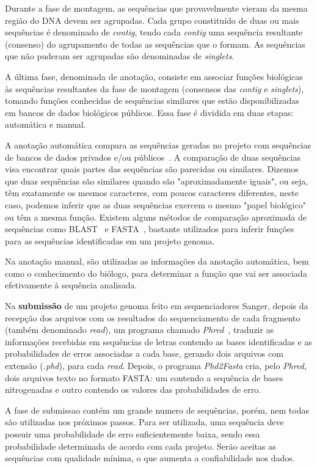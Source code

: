 Durante a fase de montagem, as sequências que provavelmente vieram da mesma região do DNA devem ser agrupadas. Cada grupo constituído de duas ou mais sequências é denominado de \textit{contig}, tendo cada \textit{contig} uma sequência resultante (consenso) do agrupamento de todas as sequências que o formam. As sequências que não puderam ser agrupadas são denominadas de \textit{singlets}. 

A última fase, denominada de anotação, consiste em associar funções biológicas às sequências resultantes da fase de montagem (consensos das \textit{contig} e \textit{singlets}), tomando funções conhecidas de sequências similares que estão disponibilizadas em bancos de dados biológicos públicos. Essa fase é dividida em duas etapas: automática e manual.

A anotação automática compara as sequências geradas no projeto com sequências de bancos de dados privados e/ou públicos~\citep{benson2006genbank:2006}. A comparação de duas sequências visa encontrar quais partes das sequências são parecidas ou similares. Dizemos que duas sequências são similares quando são "aproximadamente iguais", ou seja, têm exatamente os mesmos caracteres, com poucos caracteres diferentes, neste caso, podemos inferir que as duas sequências exercem o mesmo "papel biológico" ou têm a mesma função. Existem alguns métodos de comparação aproximada de sequências como BLAST~\citep{altschul1990basic:1990} e FASTA~\citep{pearson1988improved:1988}, bastante utilizados para inferir funções para as sequências identificadas em um projeto genoma.

Na anotação manual, são utilizadas as informações da anotação automática, bem como o conhecimento do biólogo, para determinar a função que vai ser associada efetivamente à sequência analisada.

Na \textbf{submissão} de um projeto genoma feito em sequenciadores Sanger, depois da recepção dos arquivos com os resultados do sequenciamento de cada fragmento (também denominado \textit{read}), um programa chamado \textit{Phred}~\citep{ewing1998base:1998}, traduzir as informações recebidas em sequências de letras contendo as bases identificadas e as probabilidades de erros associadas a cada base, gerando dois arquivos com extensão (\textit{.phd}), para cada \textit{read}. Depois, o programa \textit{Phd2Fasta} cria, pelo \textit{Phred}, dois arquivos texto no formato FASTA: um contendo a sequência de bases nitrogenadas e outro contendo os valores das probabilidades de erro.

A fase de submissao contém um grande numero de sequências, porém, nem todas são utilizadas nos próximos passos. Para ser utilizada, uma sequência deve possuir uma probabilidade de erro suficientemente baixa, sendo essa probabilidade determinada de acordo com cada projeto. Serão aceitas as sequências com qualidade mínima, o que aumenta a confiabilidade nos dados. 


